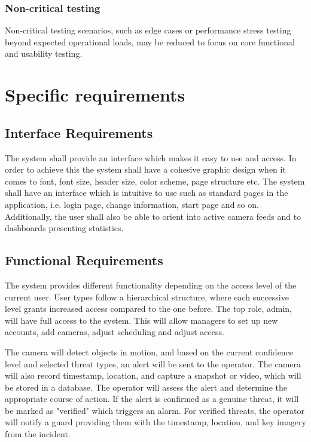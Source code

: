 \documentclass{article}
\begin{document}
\subsubsection{Non-critical testing}
Non-critical testing scenarios, such as edge cases or performance stress testing beyond expected operational loads, may be reduced to focus on core functional and usability testing.

\newpage

\section{Specific requirements}

\subsection{Interface Requirements}
The system shall provide an interface which makes it easy to use and access. In order to achieve this the system shall have a cohesive graphic design when it comes to font, font size, header size, color scheme, page structure etc. The system shall have an interface which is intuitive to use such as standard pages in the application, i.e. login page, change information, start page and so on. Additionally, the user shall also be able to orient into active camera feeds and to dashboards presenting statistics. 


\subsection{Functional Requirements}
The system provides different functionality depending on the access level of the current user. User types follow a hierarchical structure, where each successive level grants increased access compared to the one before. The top role, admin, will have full access to the system. This will allow managers to set up new accounts, add cameras, adjust scheduling and adjust access. 

The camera will detect objects in motion, and based on the current confidence level and selected threat types, an alert will be sent to the operator. The camera will also record  timestamp, location, and capture a snapshot or video, which will be stored in a database. The operator will assess the alert and determine the appropriate course of action. If the alert is confirmed as a genuine threat, it will be marked as "verified" which triggers an alarm. For verified threats, the operator will notify a guard providing them with the timestamp, location, and key imagery from the incident. 
\end{document}
